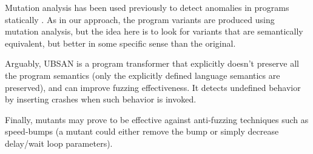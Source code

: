 Mutation analysis has been used previously to detect anomalies in programs
statically \cite{arcaini2017novel}. As in our approach, the program variants
are produced using mutation analysis, but the idea here is to look for variants
that are semantically equivalent, but better in some specific sense than the
original.

Arguably, UBSAN is a program transformer that explicitly doesn't preserve all the program
semantics (only the explicitly defined language semantics are preserved), and can improve fuzzing effectiveness.
It detects undefined behavior by inserting crashes when such behavior is invoked.

Finally, mutants may prove to be effective against anti-fuzzing \cite{jung2019fuzzification}
techniques such as speed-bumps (a mutant could either remove the bump or simply decrease delay/wait loop parameters).
